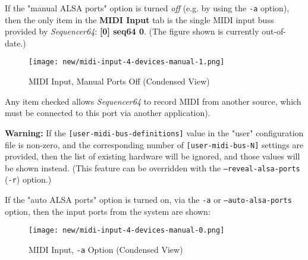    If the "manual ALSA ports" option is turned \textsl{off} (e.g. by using the
   \texttt{-a} option),
   then the only item in the \textbf{MIDI Input} tab is the single MIDI input
   buss provided by \textsl{Sequencer64}:  \textbf{[0] seq64 0}.
   (The figure shown is currently out-of-date.)


\begin{figure}[H]
   \centering 
   \texttt{[image: new/midi-input-4-devices-manual-1.png]}
   \caption{MIDI Input, Manual Ports Off (Condensed View)}
   \label{fig:seq64_midi_input_4_devices_manual_1}
\end{figure}



   Any item checked allows \textsl{Sequencer64} to record MIDI
   from another source,
   which must be connected to this port via
   another application).

   \textbf{Warning:}
   If the 
   \texttt{[user-midi-bus-definitions]} value in the "user" configuration file
   is non-zero, and the
   corresponding number of
   \texttt{[user-midi-bus-N]} settings are provided, then
   the list of existing hardware will be ignored, and those values will be
   shown instead.
   (This feature can be overridden with the
   \texttt{--reveal-alsa-ports} (\texttt{-r}) option.)


   If the "auto ALSA ports" option is turned on, via the \texttt{-a} or
   \texttt{--auto-alsa-ports} option, then
   the input ports from the system are shown:

\begin{figure}[H]
   \centering 
   \texttt{[image: new/midi-input-4-devices-manual-0.png]}
   \caption{MIDI Input, \texttt{-a} Option (Condensed View)}
   \label{fig:seq64_midi_input_4_devices_manual_0}
\end{figure}

